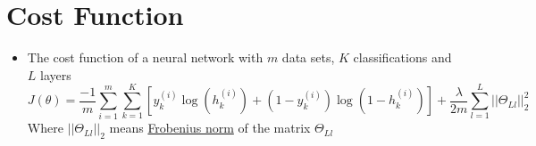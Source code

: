 \section{Cost Function}
\begin{itemize}
    \item The cost function of a neural network with $m$ data sets, $K$ classifications and $L$ layers
    \begin{equation}
        J(\theta) = \frac{-1}{m}\sum_{i=1}^{m}\sum_{k=1}^{K}\left[ y^{(i)}_k \log\left(h^{(i)}_k\right) + \left(1 - y^{(i)}_k \right) \log\left(1 - h^{(i)}_k\right) \right] + \frac{\lambda}{2m}\sum_{l=1}^{L}||\Theta_{Ll}||_2^2
    \end{equation}
    Where $||\Theta_{Ll}||_2$ means \href{https://mathworld.wolfram.com/FrobeniusNorm.html}{Frobenius norm} of the matrix $\Theta_{Ll}$ 
\end{itemize}


